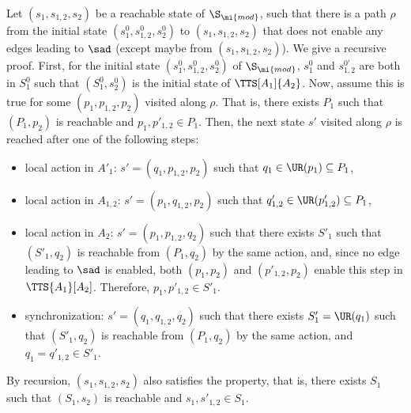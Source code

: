 \documentclass{LMCS}
\theoremstyle{plain}\newtheorem*{prop11}{Proposition~\ref{prop:states} bis}
\begin{document}
\proof Let $(s_1,s_{1,2},s_2)$ be a reachable state of $\S_\mi{mod}$, such that
  there is a path $\rho$ from the initial state $(s_1^0,s_{1,2}^0,s_2^0)$
  to $(s_1,s_{1,2},s_2)$ that does not enable any edges leading to $\sad$
  (except maybe from $(s_1,s_{1,2},s_2)$).
  We give a recursive proof. First, for the initial state
  $(s_1^0,s_{1,2}^0,s_2^0)$ of $\S_\mi{mod}$, $s_1^0$ and
  $s_{1,2}^{0\prime}$ are both in $S_1^0$ such that $(S_1^0,s_2^0)$ is the
  initial state of $\TTS[A_1]{A_2}$. Now, assume this is true for some
  $(p_1,p_{1,2},p_2)$ visited along $\rho$. That is, there exists $P_1$
  such that $(P_1,p_2)$ is reachable and $p_1,p'_{1,2}\in P_1$.
  Then, the next state $s'$ visited along $\rho$ is reached
  after one of the
  following steps:
  \begin{itemize}
    \item local action in $A'_1$: $s'=(q_1,p_{1,2},p_2)$ such that
    $q_1\in\UR(p_1)\subseteq P_1$,
    \item local action in $A_{1,2}$: $s'=(p_1,q_{1,2},p_2)$ such that
    $q'_{1,2}\in\UR(p'_{1,2})\subseteq P_1$,
    \item local action in $A_2$: $s'=(p_1,p_{1,2},q_2)$ such that
    there exists $S'_1$ such that $(S'_1,q_2)$ is reachable from $(P_1,q_2)$
    by the same action, and, since no edge leading to $\sad$ is enabled,
    both $(p_1,p_2)$ and $(p'_{1,2},p_2)$ enable this step in
    $\TTS{A_1}[A_2]$. Therefore, $p_1,p'_{1,2}\in S'_1$.
    \item synchronization: $s'=(q_1,q_{1,2},q_2)$ such that there exists
    $S'_1=\UR(q_1)$ such that $(S'_1,q_2)$ is reachable from $(P_1,q_2)$
    by the same action, and $q_1=q'_{1,2}\in S'_1$.
  \end{itemize}
  By recursion, $(s_1,s_{1,2},s_2)$ also satisfies the property, that is,
  there exists $S_1$ such that $(S_1,s_2)$ is reachable and
  $s_1,s'_{1,2}\in S_1$.
\end{document}
